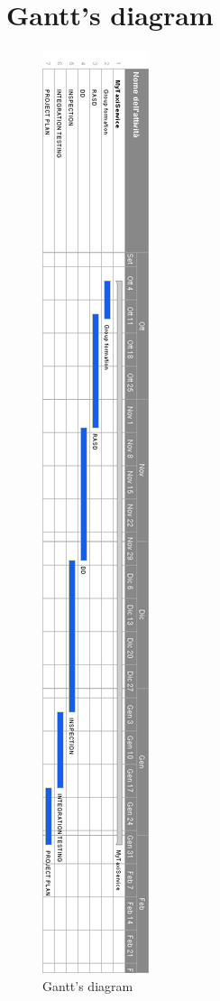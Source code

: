 \section{ Gantt's diagram}
\begin{figure} [h]
\centering
  	  \includegraphics[scale=0.5]{chapters/SWE2.png}
\caption{Gantt's diagram}
  
	\end{figure}